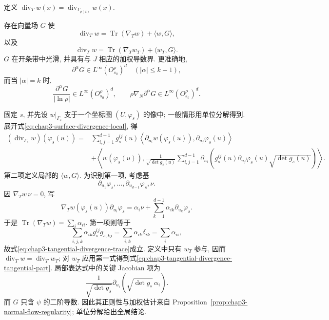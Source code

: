 \begin{Definition}
\label{def:chap3-tangential-divergence}
定义 $\operatorname{div}_Tw(x)=\operatorname{div}_{\Gamma_{\rho(x)}}w(x)$.
\end{Definition}

\begin{Proposition}
\label{prop:chap3-tangential-divergence-decomposition}
存在向量场 $G$ 使
\begin{equation}
 \operatorname{div}_Tw=\operatorname{Tr}(\nabla_Tw)+\langle w,G\rangle,
 \label{eq:chap3-tangential-divergence-trace}
\end{equation}
以及
\begin{equation}
 \operatorname{div}_Tw=\operatorname{Tr}(\nabla_Tw_T)+\langle w_T,G\rangle.
 \label{eq:chap3-tangential-divergence-tangential-part}
\end{equation}
$G$ 在开条带中光滑, 并具有与 $J$ 相应的加权导数界.
更准确地,
\[
 \partial^\alpha G\in L^\infty(O_{s_0}^\rho)^d\quad(|\alpha|\leq k-1),
\]
而当 $|\alpha|=k$ 时,
\[
 \frac{\partial^\alpha G}{|\ln\rho|}\in L^\infty(O_{s_0}^\rho)^d,
 \qquad\rho\nabla_N\partial^\alpha G\in L^\infty(O_{s_0}^\rho)^d.
\]
\end{Proposition}

\begin{Proof}
固定 $s$, 并先设 $w|_{\Gamma_s}$ 支于一个坐标图 $(U,\varphi_s)$ 的像中; 一般情形用单位分解得到. 展开式\eqref{eq:chap3-surface-divergence-local}, 得
\begin{equation}
\begin{aligned}
 (\operatorname{div}_{\Gamma_s}w)(\varphi_s(u))
 ={}&\sum_{i,j=1}^{d-1}g_s^{ij}(u)
 \left\langle\partial_{u_i}w(\varphi_s(u)),
 \partial_{u_j}\varphi_s(u)\right\rangle\\
 &+\left\langle w(\varphi_s(u)),
 \frac1{\sqrt{\det g_s(u)}}
 \sum_{i,j=1}^{d-1}\partial_{u_i}\left(
 g_s^{ij}(u)\partial_{u_j}\varphi_s(u)\sqrt{\det g_s(u)}
 \right)\right\rangle.
\end{aligned}
\label{eq:chap3-tangential-divergence-chart-expansion}
\end{equation}
第二项定义局部的 $\langle w,G\rangle$. 为识别第一项, 考虑基
\[
 \partial_{u_1}\varphi_s,\ldots,\partial_{u_{d-1}}\varphi_s,\nu.
\]
因 $\nabla_Tw\,\nu=0$, 写
\[
 \nabla_Tw(\varphi_s(u))\partial_{u_i}\varphi_s
 =\alpha_i\nu+\sum_{k=1}^{d-1}\alpha_{ik}\partial_{u_k}\varphi_s.
\]
于是 $\operatorname{Tr}(\nabla_Tw)=\sum_i\alpha_{ii}$. 第一项则等于
\[
 \sum_{i,j,k}\alpha_{ik}g_s^{ij}g_{s,kj}
 =\sum_{i,k}\alpha_{ik}\delta_{ik}=\sum_i\alpha_{ii},
\]
故式\eqref{eq:chap3-tangential-divergence-trace}成立. 定义中只有 $w_T$ 参与, 因而 $\operatorname{div}_Tw=\operatorname{div}_Tw_T$; 对 $w_T$ 应用第一式得到式\eqref{eq:chap3-tangential-divergence-tangential-part}. 局部表达式中的关键 Jacobian 项为
\[
 \frac1{\sqrt{\det g_s}}\partial_{u_i}(\sqrt{\det g_s}\,\alpha_i).
\]
而 $G$ 只含 $\psi$ 的二阶导数. 因此其正则性与加权估计来自 Proposition~\ref{prop:chap3-normal-flow-regularity}; 单位分解给出全局结论.
\end{Proof}

